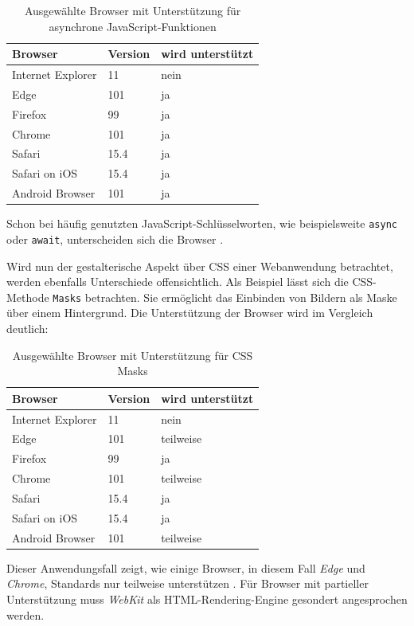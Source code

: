 \documentclass[a4paper]{scrartcl}
\begin{document}
 \begin{table}[H]
 	\centering
 	\caption{Ausgewählte Browser mit Unterstützung für asynchrone JavaScript-Funktionen}
 	\begin{center}
 		\begin{tabularx}{\linewidth}{| Y | Y | Y |}
 			\hline
 			\textbf{Browser} & \textbf{Version} & \textbf{wird unterstützt} \\
 			\hline \hline
 			Internet Explorer & 11 & nein \\
 			\hline
 			Edge & 101 & ja \\
 			\hline
 			Firefox & 99 & ja \\
 			\hline
 			Chrome & 101 & ja \\
 			\hline
 			Safari & 15.4 & ja \\
 			\hline
 			Safari on iOS & 15.4 & ja \\
 			\hline
 			Android Browser & 101 & ja \\
 			\hline
 		\end{tabularx}
 	\end{center}
	Schon bei häufig genutzten JavaScript-Schlüsselworten, wie beispielsweite \texttt{async} oder \texttt{await}, unterscheiden sich die Browser \autocite{Async_Functions}.  
 \end{table}

Wird nun der gestalterische Aspekt über CSS einer Webanwendung betrachtet, werden ebenfalls Unterschiede offensichtlich. Als Beispiel lässt sich die CSS-Methode \texttt{Masks} betrachten. Sie ermöglicht das Einbinden von Bildern als Maske über einem Hintergrund. Die Unterstützung der Browser wird im Vergleich deutlich:

 \begin{table}[H]
 	\centering
 	\caption{Ausgewählte Browser mit Unterstützung für CSS Masks}
 	\begin{center}
 		\begin{tabularx}{\linewidth}{| Y | Y | Y |}
 			\hline
 			\textbf{Browser} & \textbf{Version} & \textbf{wird unterstützt} \\
 			\hline \hline
 			Internet Explorer & 11 & nein \\
 			\hline
 			Edge & 101 & teilweise \\
 			\hline
 			Firefox & 99 & ja \\
 			\hline
 			Chrome & 101 & teilweise \\
 			\hline
 			Safari & 15.4 & ja \\
 			\hline
 			Safari on iOS & 15.4 & ja \\
 			\hline
 			Android Browser & 101 & teilweise \\
 			\hline
 		\end{tabularx}
 	\end{center}
	Dieser Anwendungsfall zeigt, wie einige Browser, in diesem Fall \textit{Edge} und \textit{Chrome}, Standards nur teilweise unterstützen \autocite{CSS_Masks}. Für Browser mit partieller Unterstützung muss \textit{WebKit} als HTML-Rendering-Engine gesondert angesprochen werden.
 \end{table}
\end{document}
